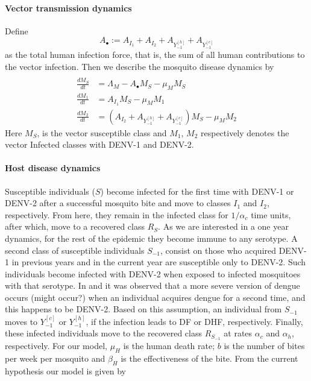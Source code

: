     \paragraph{Vector transmission dynamics}
    Define
    $$
        A_{\bullet}:=
            A_{I_1} + A_{I_2} + A_{Y_{-1}^{[h]}} + 
            A_{Y_{-1}^{[c]}}
    $$
    as the total human infection force, that is, 
    the sum of all
    human contributions to the vector infection. 
    Then we describe the mosquito disease dynamics 
    by 
    \begin{equation}
        \begin{aligned}
            \\
            \frac{dM_S}{dt}&=
                \Lambda_M
                - A_{\bullet} M_S
                - \mu_M M_S
            \\
            \frac{dM_1}{dt}&=
                A_{I_1}  M_S - \mu_M M_1
            \\
            \frac{dM_2}{dt} &=
                \left(
                    A_{I_2}+A_{Y_{-1}^{[h]}}+A_{Y_{-1}^{[c]}}
                \right) 
                M_S-\mu_M M_2
        \end{aligned}
    \end{equation}
    Here $M_S$, is the vector susceptible class and
    $M_1$, $M_2$ respectively denotes the vector 
    Infected classes with \ac{DENV-1}
    and \ac{DENV-2}.
    \paragraph{Host disease dynamics}
        Susceptible individuals ($S$) become infected for the first time
        with DENV-1 or DENV-2 after  a successful mosquito bite and move
        to classes $I_1$ and $I_2$, respectively. From here, they remain
        in the infected class for $1/\alpha_c$ time units, after which,
        move to a recovered class $R_S$.  As we are interested in a one
        year dynamics, for the rest of the epidemic they become immune to
        any serotype. A second class of susceptible individuals $S_{-1}$,
        consist on those who acquired DENV-1 in previous years and in the
        current year are susceptible only to DENV-2. Such individuals
        become infected with DENV-2 when exposed to infected mosquitoes
        with that serotype. In \cite{OhAinle2011} and
        \cite{Sangkawibha1984} it was observed that a more severe version
        of dengue occurs (might occur?) when an individual acquires dengue
        for a second time, and this happens to be DENV-2. Based on this
        assumption, an individual from $S_{-1}$ moves to $Y_{-1}^{[c]}$ or
        $Y_{-1}^{[h]}$, if the infection leads to DF or DHF, respectively.
        Finally, these infected individuals move to the recovered class
        $R_{S_{-1}}$ at rates $\alpha_c$ and $\alpha_h$, respectively. For
        our model, $\mu_H$ is the human death rate; $b$ is the number of
        bites per week per mosquito and $\beta_H$ is the effectiveness of
        the bite. From the current hypothesis our model is given by    

